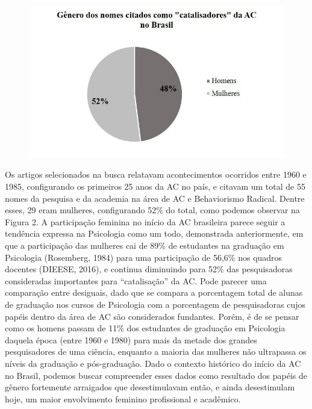 \begin{figure}
\includegraphics[width=1\textwidth]{1/figura2}
\end{figure}

Os artigos selecionados na busca relatavam acontecimentos ocorridos entre 1960 e 1985, configurando os primeiros 25 anos da AC no país, e citavam um total de 55 nomes da pesquisa e da academia na área de AC e Behaviorismo Radical. Dentre esses, 29 eram mulheres, configurando 52\% do total, como podemos observar na Figura 2. A participação feminina no início da AC brasileira parece seguir a tendência expressa na Psicologia como um todo, demonstrada anteriormente, em que a participação das mulheres cai de 89\% de estudantes na graduação em Psicologia (Rosemberg, 1984) para uma participação de 56,6\% nos quadros docentes (DIEESE, 2016), e continua diminuindo para 52\% das pesquisadoras consideradas importantes para “catalisação” da AC. Pode parecer uma comparação entre desiguais, dado que se compara a porcentagem total de alunas de graduação nos cursos de Psicologia com a porcentagem de pesquisadoras cujos papéis dentro da área de AC são considerados fundantes. Porém, é de se pensar como os homens passam de 11\% dos estudantes de graduação em Psicologia daquela época (entre 1960 e 1980) para mais da metade dos grandes pesquisadores de uma ciência, enquanto a maioria das mulheres não ultrapassa os níveis da graduação e pós-graduação. Dado o contexto histórico do início da AC no Brasil, podemos buscar compreender esses dados como resultado dos papéis de gênero fortemente arraigados que desestimulavam então, e ainda desestimulam hoje, um maior envolvimento feminino profissional e acadêmico.

